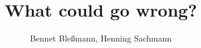 \documentclass[12pt,a0paper,landscape]{article}
\author{Bennet Bleßmann, Henning Sachmann}
\begin{document}
\title{What could go wrong?}
\end{document}
